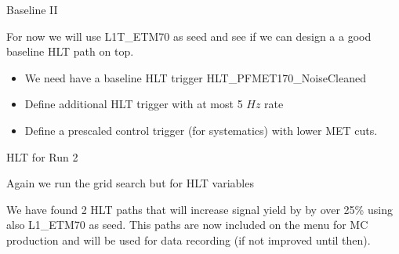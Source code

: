 \documentclass[8pt]{beamer}
\begin{document}
\begin{frame}{Baseline II}
 
For now we will use L1T\_ETM70 as seed and see if we can design a a good baseline HLT path on top.
\begin{itemize}
  \item We need have a baseline HLT trigger HLT\_PFMET170\_NoiseCleaned
  \item Define additional HLT trigger with at most 5 $Hz$ rate
  \item Define a prescaled control trigger (for systematics) with lower MET cuts.
\end{itemize}
 
\begin{block}{HLT for Run 2}

Again we run the grid search but for HLT variables

\centering
{}

\end{block}

We have found 2 HLT paths that will increase signal yield by by over 25\% using also L1\_ETM70 as seed. This paths are now included on the menu for MC production and will be used for data recording (if not improved until then).

\end{frame}
\end{document}
